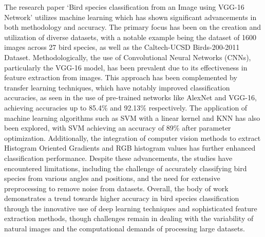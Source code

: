 The research paper `Bird species classification from an Image using VGG-16
Network' utilizes machine learning which has shown
significant advancements in both methodology and accuracy. The primary focus
has been on the creation and utilization of diverse datasets, with a notable
example being the dataset of 1600 images across 27 bird species, as well as the
Caltech-UCSD Birds-200-2011 Dataset. Methodologically, the use of Convolutional
Neural Networks (CNNs), particularly the VGG-16 model, has been prevalent due
to its effectiveness in feature extraction from images. This approach has been
complemented by transfer learning techniques, which have notably improved
classification accuracies, as seen in the use of pre-trained networks like
AlexNet and VGG-16, achieving accuracies up to 85.4\% and 92.13\% respectively.
The application of machine learning algorithms such as SVM with a linear kernel
and KNN has also been explored, with SVM achieving an accuracy of 89\% after
parameter optimization. Additionally, the integration of computer vision
methods to extract Histogram Oriented Gradients and RGB histogram values has
further enhanced classification performance. Despite these advancements, the
studies have encountered limitations, including the challenge of accurately
classifying bird species from various angles and positions, and the need for
extensive preprocessing to remove noise from datasets. Overall, the body of
work demonstrates a trend towards higher accuracy in bird species
classification through the innovative use of deep learning techniques and
sophisticated feature extraction methods, though challenges remain in dealing
with the variability of natural images and the computational demands of
processing large datasets.\cite{islam2019bird}\\


